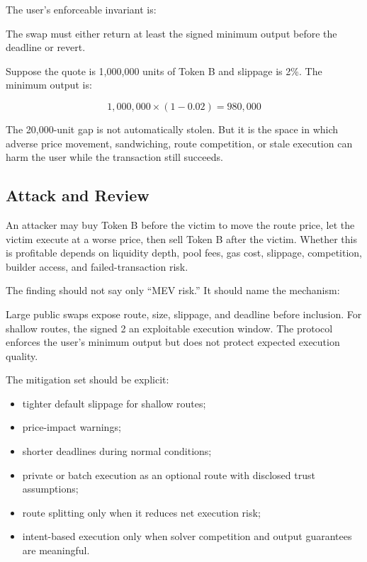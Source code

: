The user's enforceable invariant is:

\begin{codeblock}
The swap must either return at least the signed minimum output before
the deadline or revert.
\end{codeblock}

Suppose the quote is 1,000,000 units of Token B and slippage is 2\%. The minimum output is:

\[
1{,}000{,}000 \times (1 - 0.02) = 980{,}000
\]

The 20,000-unit gap is not automatically stolen. But it is the space in which adverse price movement, sandwiching, route competition, or stale execution can harm the user while the transaction still succeeds.

\subsection{Attack and Review}

An attacker may buy Token B before the victim to move the route price, let the victim execute at a worse price, then sell Token B after the victim. Whether this is profitable depends on liquidity depth, pool fees, gas cost, slippage, competition, builder access, and failed-transaction risk.

The finding should not say only ``MEV risk.'' It should name the mechanism:

\begin{codeblock}
Large public swaps expose route, size, slippage, and deadline before
inclusion. For shallow routes, the signed 2%
an exploitable execution window. The protocol enforces the user's
minimum output but does not protect expected execution quality.
\end{codeblock}

The mitigation set should be explicit:

\begin{itemize}
\item tighter default slippage for shallow routes;
\item price-impact warnings;
\item shorter deadlines during normal conditions;
\item private or batch execution as an optional route with disclosed trust assumptions;
\item route splitting only when it reduces net execution risk;
\item intent-based execution only when solver competition and output guarantees are meaningful.
\end{itemize}

